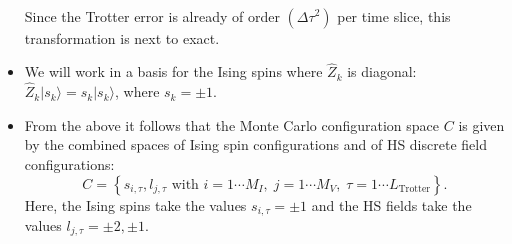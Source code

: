\documentclass{SciPost}
\begin{document}
\begin{itemize}
\begin{eqnarray}
\nonumber
\end{eqnarray}
Since the Trotter error is already of order $(\Delta \tau ^2) $ per time slice, this transformation is next to exact. 
\item  We will work in  a basis for the Ising spins  where  $\hat{Z}_k$ is diagonal: $\hat{Z}_{k}|s_{k}\rangle = s_{k}|s_{k}\rangle$, where $s_{k}=\pm 1$.
\item From the above it follows that the  Monte Carlo configuration space $C$  
is given by the combined spaces of Ising spin configurations  and of HS discrete field configurations:
\begin{equation}
	C = \left\{   s_{i,\tau} ,  l_{j,\tau}  \text{ with }  i=1\cdots M_I,\;  j = 1\cdots M_V,\; \tau=1\cdots L_{\mathrm{Trotter}}  \right\}.
\end{equation}
Here, the Ising spins take the values  $s_{i,\tau} = \pm 1$ and  the HS fields take the values  $l_{j,\tau}  = \pm 2, \pm 1 $.
\end{itemize}
%
\end{document}
